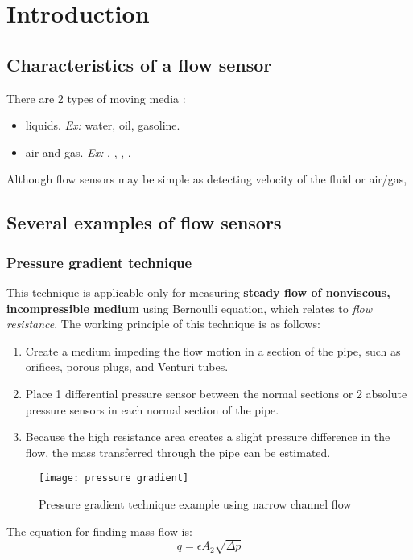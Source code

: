 \chapter{Introduction}
\section{Characteristics of a flow sensor}

There are 2 types of moving media \cite{handbook}:
\begin{itemize}
	\item liquids. \textit{Ex:} water, oil, gasoline.
	\item air and gas. \textit{Ex:} , , , .	
\end{itemize}

Although flow sensors may be simple as detecting velocity of the fluid or air/gas, 
\section{Several examples of flow sensors}
\subsection{Pressure gradient technique}
This technique is applicable only for measuring \textbf{steady flow of nonviscous, incompressible medium} using Bernoulli equation, which relates to \textit{flow resistance}. The working principle of this technique is as follows:
\begin{enumerate}
	\item Create a medium impeding the flow motion in a section of the pipe, such as orifices, porous plugs, and Venturi tubes.
	\item Place 1 differential pressure sensor between the normal sections or 2 absolute pressure sensors in each normal section of the pipe.
	\item Because the high resistance area creates a slight pressure difference in the flow, the mass transferred through the pipe can be estimated.
\end{enumerate}
\begin{figure}[ht]
	\centering
	\texttt{[image: pressure gradient]}
	\caption{Pressure gradient technique example using narrow channel flow \cite{handbook}}
	\label{fig:01}
\end{figure}

The equation for finding mass flow is:
\begin{equation}
q = \epsilon A_2 \sqrt{\Delta p}
\end{equation}

